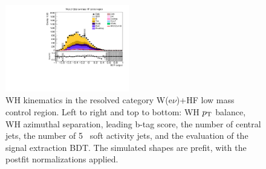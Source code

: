 \begin{figure}[tbp]
\begin{center}
    \includegraphics[width=0.48\textwidth]{figures/wlnhbb2016/resolved/WenWHHeavyFlavorCRLowMass_bdtValue.pdf}
    \caption{WH kinematics in the resolved category W(e$\nu$)+HF low mass control region.
    Left to right and top to bottom: WH $p_{\mathrm{T}}$ balance, WH azimuthal separation, leading b-tag score, the number of central jets,
    the number of 5 \GeV\ soft activity jets, and the evaluation of the signal extraction BDT.
    The simulated shapes are prefit, with the postfit normalizations applied.}
    \label{fig:res_WenHFLowMass_WH}
  \end{center}
\end{figure}
\clearpage


